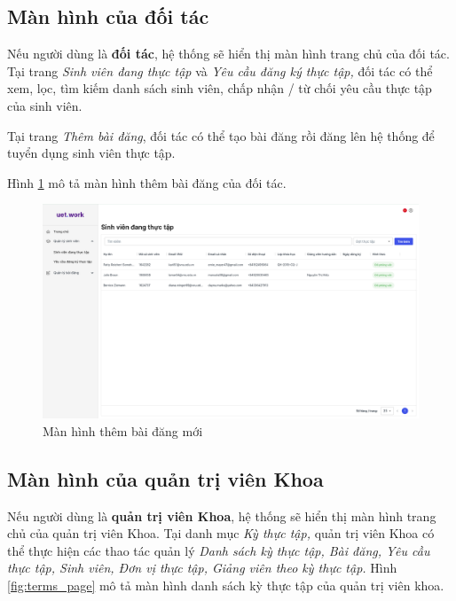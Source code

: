 \documentclass[./../main.tex]{subfiles}
\begin{document}
\subsection{Màn hình của đối tác}


Nếu người dùng là \textbf{đối tác}, hệ thống sẽ hiển thị màn hình trang
chủ của đối tác. Tại trang \emph{Sinh viên đang thực tập} và \emph{Yêu
cầu đăng ký thực tập,} đối tác có thể xem, lọc, tìm kiếm danh sách sinh
viên, chấp nhận / từ chối yêu cầu thực tập của sinh viên.


Tại trang \emph{Thêm bài đăng}, đối tác có thể tạo bài đăng rồi đăng lên
hệ thống để tuyển dụng sinh viên thực tập.

Hình \ref{fig:add_post_page} mô tả màn hình thêm bài đăng của đối tác.

\begin{figure}[]
	\includegraphics[width=\linewidth]{./images/image9.png}
	\caption{Màn hình thêm bài đăng mới}
	\label{fig:add_post_page}
\end{figure}

\subsection{Màn hình của quản trị viên Khoa}


Nếu người dùng là \textbf{quản trị viên Khoa}, hệ thống sẽ hiển thị màn
hình trang chủ của quản trị viên Khoa. Tại danh mục \emph{Kỳ thực tập,}
quản trị viên Khoa có thể thực hiện các thao tác quản lý \emph{Danh sách
kỳ thực tập, Bài đăng, Yêu cầu thực tập, Sinh viên, Đơn vị thực tập,
Giảng viên theo kỳ thực tập.} Hình \ref{fig:terms_page} mô tả màn hình danh sách kỳ thực tập của quản trị viên khoa.
\end{document}
